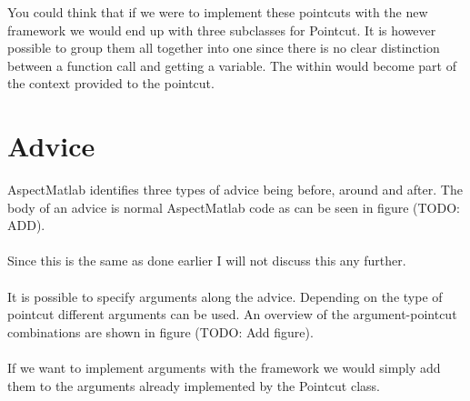 \documentclass[a4paper]{report}
\begin{document}
You could think that if we were to implement these pointcuts with the new framework we would end up with three subclasses for Pointcut. It is however possible to group them all together into one since there is no clear distinction between a function call and getting a variable. The within would become part of the context provided to the pointcut.

\section{Advice}
AspectMatlab identifies three types of advice being before, around and after. The body of an advice is normal AspectMatlab code as can be seen in figure (TODO: ADD).\\
\\
Since this is the same as done earlier I will not discuss this any further.\\
\\
It is possible to specify arguments along the advice. Depending on the type of pointcut different arguments can be used. An overview of the argument-pointcut combinations are shown in figure (TODO: Add figure).\\
\\
If we want to implement arguments with the framework we would simply add them to the arguments already implemented by the Pointcut class.
\end{document}
